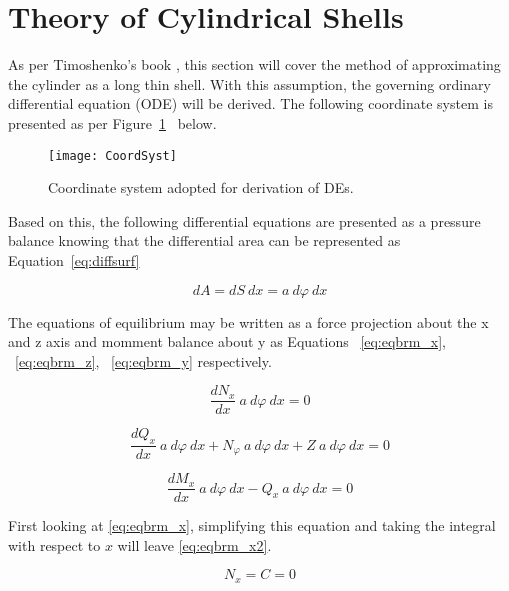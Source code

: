 \section{Theory of Cylindrical Shells}

As per Timoshenko's book \cite{timoshenko1959theory}, this section will cover the method of approximating the cylinder as a long thin shell. With this assumption, the governing ordinary differential equation (ODE) will be derived. The following coordinate system is presented as per Figure~\ref{fig:CoordSyst}~\cite{timoshenko1959theory} below.

\begin{figure}[H]
	\centering
	\texttt{[image: CoordSyst]}
	\caption{Coordinate system adopted for derivation of DEs.}
	\label{fig:CoordSyst}
\end{figure}

Based on this, the following differential equations are presented as a pressure balance knowing that the differential area can be represented as Equation~\ref{eq:diffsurf}
 
\begin{equation}
	\label{eq:diffsurf}
	dA = dS\ dx = a\ d\varphi \ dx   
\end{equation}

The equations of equilibrium may be written as a force projection about the x and z axis and momment balance about y as Equations ~\ref{eq:eqbrm_x}, ~\ref{eq:eqbrm_z}, ~\ref{eq:eqbrm_y} respectively.

\begin{equation}
	\label{eq:eqbrm_x}
	\frac{dN_x}{dx}\ a\ d\varphi \ dx = 0
\end{equation}

\begin{equation}
	\label{eq:eqbrm_z}
	\frac{dQ_x}{dx}\ a\ d\varphi \ dx+ N_\varphi \ a\ d\varphi \ dx +Z\ a\ d\varphi \ dx= 0
\end{equation}

\begin{equation}
	\label{eq:eqbrm_y}
	\frac{dM_x}{dx}\ a\ d\varphi \ dx- Q_x\ a\ d\varphi \ dx= 0
\end{equation}

First looking at \ref{eq:eqbrm_x}, simplifying this equation and taking the integral with respect to $x$ will leave \ref{eq:eqbrm_x2}. 

\begin{equation}
	\label{eq:eqbrm_x2}
	N_x = C = 0 
\end{equation}

